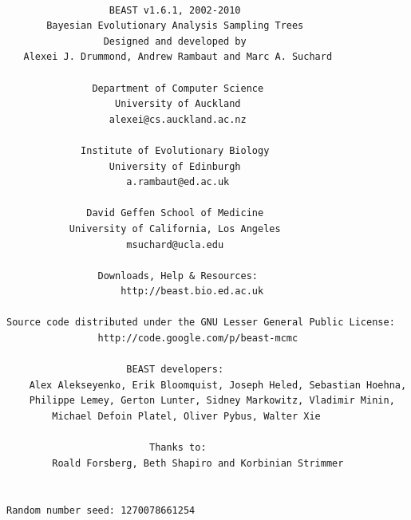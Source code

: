 \documentclass[12pt]{article}
\begin{document}
{\scriptsize   
\begin{verbatim}

                  BEAST v1.6.1, 2002-2010
       Bayesian Evolutionary Analysis Sampling Trees
                 Designed and developed by
   Alexei J. Drummond, Andrew Rambaut and Marc A. Suchard
                              
               Department of Computer Science
                   University of Auckland
                  alexei@cs.auckland.ac.nz
                              
             Institute of Evolutionary Biology
                  University of Edinburgh
                     a.rambaut@ed.ac.uk
                              
              David Geffen School of Medicine
           University of California, Los Angeles
                     msuchard@ucla.edu
                              
                Downloads, Help & Resources:
                 	http://beast.bio.ed.ac.uk
                              
Source code distributed under the GNU Lesser General Public License:
            	http://code.google.com/p/beast-mcmc
                              
                     BEAST developers:
	Alex Alekseyenko, Erik Bloomquist, Joseph Heled, Sebastian Hoehna, 
	Philippe Lemey, Gerton Lunter, Sidney Markowitz, Vladimir Minin, 
      	Michael Defoin Platel, Oliver Pybus, Walter Xie
                              
                         Thanks to:
    	Roald Forsberg, Beth Shapiro and Korbinian Strimmer


Random number seed: 1270078661254


\end{verbatim}}
\end{document}
